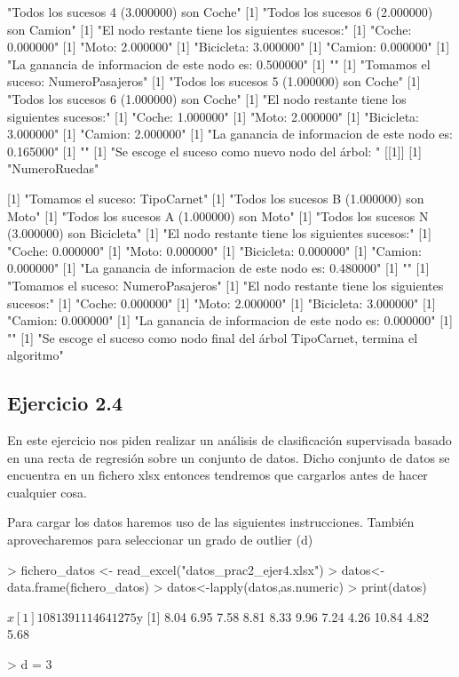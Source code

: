 \documentclass[parskip=full]{scrartcl}
\begin{document}
\begin{Schunk}
\begin{Soutput}
[1] "Todos los sucesos 4 (3.000000) son Coche"
[1] "Todos los sucesos 6 (2.000000) son Camion"
[1] "El nodo restante tiene los siguientes sucesos:"
[1] "Coche: 0.000000"
[1] "Moto: 2.000000"
[1] "Bicicleta: 3.000000"
[1] "Camion: 0.000000"
[1] "La ganancia de informacion de este nodo es: 0.500000"
[1] ""
[1] "Tomamos el suceso: NumeroPasajeros"
[1] "Todos los sucesos 5 (1.000000) son Coche"
[1] "Todos los sucesos 6 (1.000000) son Coche"
[1] "El nodo restante tiene los siguientes sucesos:"
[1] "Coche: 1.000000"
[1] "Moto: 2.000000"
[1] "Bicicleta: 3.000000"
[1] "Camion: 2.000000"
[1] "La ganancia de informacion de este nodo es: 0.165000"
[1] ""
[1] "Se escoge el suceso como nuevo nodo del árbol: "
[[1]]
[1] "NumeroRuedas"

[1] "Tomamos el suceso: TipoCarnet"
[1] "Todos los sucesos B (1.000000) son Moto"
[1] "Todos los sucesos A (1.000000) son Moto"
[1] "Todos los sucesos N (3.000000) son Bicicleta"
[1] "El nodo restante tiene los siguientes sucesos:"
[1] "Coche: 0.000000"
[1] "Moto: 0.000000"
[1] "Bicicleta: 0.000000"
[1] "Camion: 0.000000"
[1] "La ganancia de informacion de este nodo es: 0.480000"
[1] ""
[1] "Tomamos el suceso: NumeroPasajeros"
[1] "El nodo restante tiene los siguientes sucesos:"
[1] "Coche: 0.000000"
[1] "Moto: 2.000000"
[1] "Bicicleta: 3.000000"
[1] "Camion: 0.000000"
[1] "La ganancia de informacion de este nodo es: 0.000000"
[1] ""
[1] "Se escoge el suceso como nodo final del árbol TipoCarnet, termina el algoritmo"
\end{Soutput}
\end{Schunk}


\subsection{Ejercicio 2.4}

En este ejercicio nos piden realizar un análisis de clasificación supervisada basado en una recta de regresión sobre un conjunto de datos. Dicho conjunto de datos se encuentra en un fichero xlsx entonces tendremos que cargarlos antes de hacer cualquier cosa.

Para cargar los datos haremos uso de las siguientes instrucciones. También aprovecharemos para seleccionar un grado de outlier (d)


\begin{Schunk}
\begin{Sinput}
> fichero_datos <- read_excel("datos_prac2_ejer4.xlsx")
> datos<-data.frame(fichero_datos)
> datos<-lapply(datos,as.numeric)
> print(datos)
\end{Sinput}
\begin{Soutput}
$x
 [1] 10  8 13  9 11 14  6  4 12  7  5

$y
 [1]  8.04  6.95  7.58  8.81  8.33  9.96  7.24  4.26 10.84  4.82  5.68
\end{Soutput}
\begin{Sinput}
> d = 3
\end{Sinput}
\end{Schunk}
\end{document}

